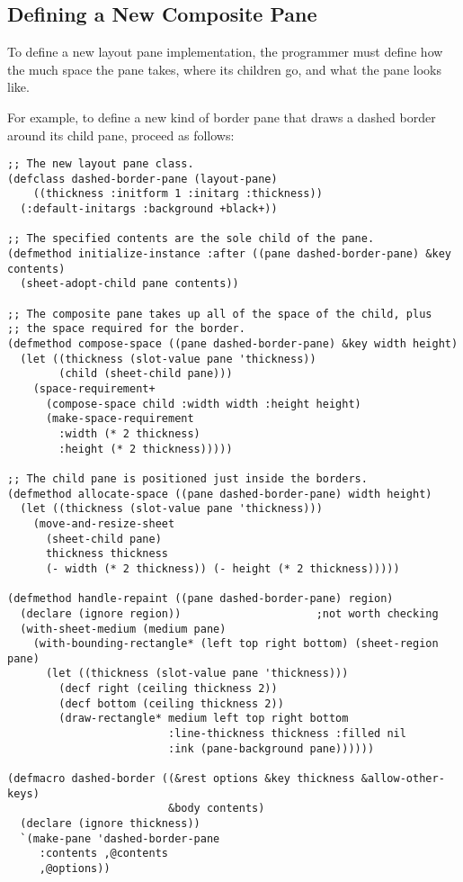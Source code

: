 \subsection {Defining a New Composite Pane} 

To define a new layout pane implementation, the programmer must define how the
much space the pane takes, where its children go, and what the pane looks like.

For example, to define a new kind of border pane that draws a dashed border
around its child pane, proceed as follows:

\begin{verbatim}
;; The new layout pane class.
(defclass dashed-border-pane (layout-pane)
    ((thickness :initform 1 :initarg :thickness))
  (:default-initargs :background +black+))

;; The specified contents are the sole child of the pane.
(defmethod initialize-instance :after ((pane dashed-border-pane) &key contents)
  (sheet-adopt-child pane contents))

;; The composite pane takes up all of the space of the child, plus
;; the space required for the border.
(defmethod compose-space ((pane dashed-border-pane) &key width height)
  (let ((thickness (slot-value pane 'thickness))
        (child (sheet-child pane)))
    (space-requirement+
      (compose-space child :width width :height height)
      (make-space-requirement 
        :width (* 2 thickness)
        :height (* 2 thickness)))))

;; The child pane is positioned just inside the borders.
(defmethod allocate-space ((pane dashed-border-pane) width height)
  (let ((thickness (slot-value pane 'thickness)))
    (move-and-resize-sheet
      (sheet-child pane)
      thickness thickness
      (- width (* 2 thickness)) (- height (* 2 thickness)))))
  
(defmethod handle-repaint ((pane dashed-border-pane) region)
  (declare (ignore region))                     ;not worth checking
  (with-sheet-medium (medium pane)
    (with-bounding-rectangle* (left top right bottom) (sheet-region pane)
      (let ((thickness (slot-value pane 'thickness)))
        (decf right (ceiling thickness 2))
        (decf bottom (ceiling thickness 2))
        (draw-rectangle* medium left top right bottom
                         :line-thickness thickness :filled nil
                         :ink (pane-background pane))))))

(defmacro dashed-border ((&rest options &key thickness &allow-other-keys)
                         &body contents)
  (declare (ignore thickness))
  `(make-pane 'dashed-border-pane
     :contents ,@contents
     ,@options))
\end{verbatim}

